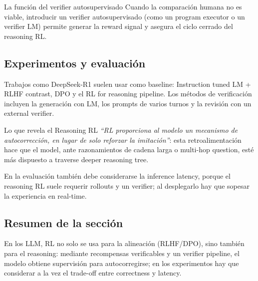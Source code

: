 \begin{knowledgebox}{La función del verifier autosupervisado}
Cuando la comparación humana no es viable, introducir un verifier autosupervisado (como un program executor o un verifier LM) permite generar la reward signal y asegura el ciclo cerrado del reasoning RL.
\end{knowledgebox}

\subsection{Experimentos y evaluación}

Trabajos como DeepSeek-R1 suelen usar como baseline: Instruction tuned LM + RLHF contrast, DPO y el RL for reasoning pipeline. Los métodos de verificación incluyen la generación con LM, los prompts de varios turnos y la revisión con un external verifier.

\begin{importantbox}{Lo que revela el Reasoning RL}
\textit{``RL proporciona al modelo un mecanismo de autocorrección, en lugar de solo reforzar la imitación''}: esta retroalimentación hace que el model, ante razonamientos de cadena larga o multi-hop question, esté más dispuesto a traverse deeper reasoning tree.
\end{importantbox}

En la evaluación también debe considerarse la inference latency, porque el reasoning RL suele requerir rollouts y un verifier; al desplegarlo hay que sopesar la experiencia en real-time.

\subsection{Resumen de la sección}

En los LLM, RL no solo se usa para la alineación (RLHF/DPO), sino también para el reasoning: mediante recompensas verificables y un verifier pipeline, el modelo obtiene supervisión para autocorregirse; en los experimentos hay que considerar a la vez el trade-off entre correctness y latency.
